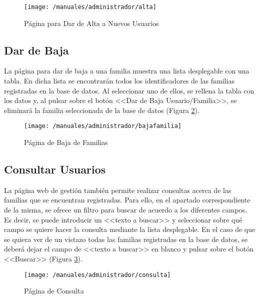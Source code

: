 \begin{figure}[!h]
	\begin{center}
		\texttt{[image: /manuales/administrador/alta]}
		\caption{Página para Dar de Alta a Nuevos Usuarios}
		\label{fig:altaweb}
	\end{center}
\end{figure}

\clearpage

\subsection*{Dar de Baja}
La página para dar de baja a una familia muestra una lista desplegable con una tabla. En dicha lista se encontrarán todos los identificadores de las familias registradas en la base de datos. Al seleccionar uno de ellos, se rellena la tabla con los datos y, al pulsar sobre el botón <<Dar de Baja Usuario/Familia>>, se eliminará la familia seleccionada de la base de datos (Figura \ref{fig:bajaweb}).

\begin{figure}[!h]
	\begin{center}
		\texttt{[image: /manuales/administrador/bajafamilia]}
		\caption{Página de Baja de Familias}
		\label{fig:bajaweb}
	\end{center}
\end{figure}

\subsection*{Consultar Usuarios}
La página web de gestión también permite realizar consultas acerca de las familias que se encuentran registradas. Para ello, en el apartado correspondiente de la misma, se ofrece un filtro para buscar de acuerdo a los diferentes campos. Es decir, se puede introducir un <<texto a buscar>> y seleccionar sobre qué campo se quiere hacer la consulta mediante la lista desplegable. En el caso de que se quiera ver de un vistazo todas las familias registradas en la base de datos, se deberá dejar el campo de <<texto a buscar>> en blanco y pulsar sobre el botón <<Buscar>> (Figura \ref{fig:consultaweb}).

\begin{figure}[!h]
	\begin{center}
		\texttt{[image: /manuales/administrador/consulta]}
		\caption{Página de Consulta}
		\label{fig:consultaweb}
	\end{center}
\end{figure}


